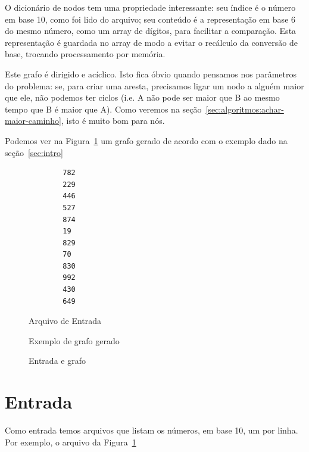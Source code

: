 \documentclass[12pt]{article}
\begin{document}
O dicionário de nodos tem uma propriedade interessante: seu índice é o número em base 10, como foi lido do arquivo; seu conteúdo é a representa\c{c}ão em base 6 do mesmo número, como um array de dígitos, para facilitar a compara\c{c}ão. Esta representa\c{c}ão é guardada no array de modo a evitar o recálculo da conversão de base, trocando processamento por memória.

Este grafo é dirigido e acíclico. Isto fica óbvio quando pensamos nos parâmetros do problema: se, para criar uma aresta, precisamos ligar um nodo a alguém maior que ele, não podemos ter ciclos (i.e. A não pode ser maior que B ao mesmo tempo que B é maior que A). Como veremos na se\c{c}ão~\ref{sec:algoritmos:achar-maior-caminho}, isto é muito bom para nós.


Podemos ver na Figura~\ref{fig:testeprof} um grafo gerado de acordo com o exemplo dado na se\c{c}ão~\ref{sec:intro}

\begin{figure}[H]
  \noindent %
  \begin{minipage}[t]{0.3\columnwidth}%
        \begin{lstlisting}
        782
        229
        446
        527
        874
        19
        829
        70
        830
        992
        430
        649
        \end{lstlisting}
        \caption{Arquivo de Entrada}
        \label{fig:testeprof:entrada}
  \end{minipage}
  \begin{minipage}[t][1\totalheight][b]{0.65\textwidth}%
        \begin{dot2tex}[neato,options=-tmath]
            
        \end{dot2tex}
        \caption{Exemplo de grafo gerado}
        \label{fig:testeprof:grafo}
  \end{minipage}
  \caption{Entrada e grafo}
  \label{fig:testeprof}
\end{figure}

\section{Entrada}\label{sec:entrada}
Como entrada temos arquivos que listam os números, em base 10, um por linha. Por exemplo, o arquivo da Figura~\ref{fig:testeprof}
\end{document}

